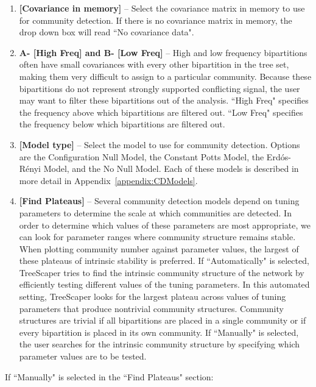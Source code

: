 \documentclass[11pt]{article}
\begin{document}
\begin{enumerate}[{\bf 1-}]
\item {\bf [Covariance in memory]} -- Select the covariance matrix in memory to use for community
detection. If there is no covariance matrix in memory, the drop down box will read ``No
covariance data".

\item {\bf A- [High Freq] and B- [Low Freq]} -- High and low frequency bipartitions often have small
covariances with every other bipartition in the tree set, making them very difficult to assign to
a particular community. Because these bipartitions do not represent strongly supported
conflicting signal, the user may want to filter these bipartitions out of the analysis. ``High
Freq" specifies the frequency above which bipartitions are filtered out. ``Low Freq" specifies
the frequency below which bipartitions are filtered out.

\item {\bf [Model type]} -- Select the model to use for community detection. Options are the
Configuration Null Model, the Constant Potts Model, the Erd\'{o}s-R\'{e}nyi  Model, and the No
Null Model. Each of these models is described in more detail in Appendix~\ref{appendix:CDModels}.

\item {\bf [Find Plateaus]} -- Several community detection models depend on tuning parameters to
determine the scale at which communities are detected. In order to determine which values
of these parameters are most appropriate, we can look for parameter ranges where
community structure remains stable. When plotting community number against parameter
values, the largest of these plateaus of intrinsic stability is preferred. If ``Automatically" is
selected, TreeScaper tries to find the intrinsic community structure of the network by
efficiently testing different values of the tuning parameters. In this automated setting,
TreeScaper looks for the largest plateau across values of tuning parameters that produce nontrivial community structures. Community structures are trivial if all bipartitions are placed in
a single community or if every bipartition is placed in its own community. If ``Manually" is
selected, the user searches for the intrinsic community structure by specifying which
parameter values are to be tested. \\
\end{enumerate}


\noindent If ``Manually" is selected in the ``Find Plateaus" section: \\
\end{document}

